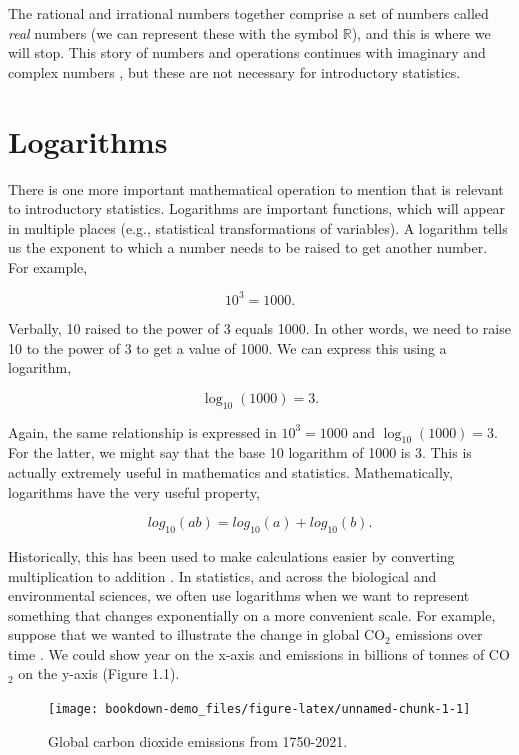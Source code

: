 \documentclass[
  openany]{krantz}
\begin{document}
The rational and irrational numbers together comprise a set of numbers called \emph{real} numbers (we can represent these with the symbol \(\mathbb{R}\)), and this is where we will stop.
This story of numbers and operations continues with imaginary and complex numbers \citep{Courant1996, Pastor2008}, but these are not necessary for introductory statistics.

\hypertarget{logarithms}{%
\section{Logarithms}\label{logarithms}}

There is one more important mathematical operation to mention that is relevant to introductory statistics.
Logarithms are important functions, which will appear in multiple places (e.g., statistical transformations of variables).
A logarithm tells us the exponent to which a number needs to be raised to get another number.
For example,

\[10^{3} = 1000.\]

Verbally, 10 raised to the power of 3 equals 1000.
In other words, we need to raise 10 to the power of 3 to get a value of 1000.
We can express this using a logarithm,

\[\log_{10}\left(1000\right) = 3.\]

Again, the same relationship is expressed in \(10^{3} = 1000\) and \(\log_{10}(1000) = 3\).
For the latter, we might say that the base 10 logarithm of 1000 is 3.
This is actually extremely useful in mathematics and statistics.
Mathematically, logarithms have the very useful property,

\[log_{10}(ab) = log_{10}(a) + log_{10}(b).\]

Historically, this has been used to make calculations easier by converting multiplication to addition \citep{Stewart2008}.
In statistics, and across the biological and environmental sciences, we often use logarithms when we want to represent something that changes exponentially on a more convenient scale.
For example, suppose that we wanted to illustrate the change in global CO\(_{2}\) emissions over time \citep{Friedlingstein2022}.
We could show year on the x-axis and emissions in billions of tonnes of CO\(_{2}\) on the y-axis (Figure 1.1).

\begin{figure}
\texttt{[image: bookdown-demo\_files/figure-latex/unnamed-chunk-1-1]} \caption{Global carbon dioxide emissions from 1750-2021.}\label{fig:unnamed-chunk-1}
\end{figure}
\end{document}

